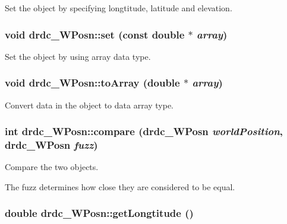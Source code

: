 Set the object by specifying longtitude, latitude and elevation. 

\hypertarget{classdrdc__WPosn_2af599ff4db1922f5b95c1a03d70c0cd}{
\subsubsection[set]{\setlength{\rightskip}{0pt plus 5cm}void drdc\_\-WPosn::set (const double $\ast$ {\em array})}}
\label{classdrdc__WPosn_2af599ff4db1922f5b95c1a03d70c0cd}


Set the object by using array data type. 

\hypertarget{classdrdc__WPosn_e478f6d6dc986f8a370f888152435b3f}{
\subsubsection[toArray]{\setlength{\rightskip}{0pt plus 5cm}void drdc\_\-WPosn::toArray (double $\ast$ {\em array})}}
\label{classdrdc__WPosn_e478f6d6dc986f8a370f888152435b3f}


Convert data in the object to data array type. 

\hypertarget{classdrdc__WPosn_d6c93a1d4a91e10d455250e3d9f61e68}{
\subsubsection[compare]{\setlength{\rightskip}{0pt plus 5cm}int drdc\_\-WPosn::compare ({\bf drdc\_\-WPosn} {\em worldPosition}, \/  {\bf drdc\_\-WPosn} {\em fuzz})}}
\label{classdrdc__WPosn_d6c93a1d4a91e10d455250e3d9f61e68}


Compare the two objects. 

The fuzz determines how close they are considered to be equal. \hypertarget{classdrdc__WPosn_c0ee4adae6fd10005bddc94e98d0cd8c}{
\subsubsection[getLongtitude]{\setlength{\rightskip}{0pt plus 5cm}double drdc\_\-WPosn::getLongtitude ()}}
\label{classdrdc__WPosn_c0ee4adae6fd10005bddc94e98d0cd8c}


